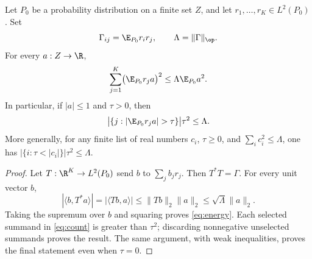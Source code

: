 \begin{lemma}\label{thm:energy}
Let $P_0$ be a probability distribution on a finite set $Z$, and let $r_1,\ldots,r_K\in L^2(P_0)$. Set
\[
 \Gamma_{ij}=\E_{P_0}r_i r_j,\qquad \Lambda=\|\Gamma\|_\op.
\]
For every $a:Z\to\R$,
\begin{equation}\label{eq:energy}
 \sum_{j=1}^K\bigl(\E_{P_0}r_j a\bigr)^2
 \leq\Lambda\E_{P_0}a^2.
\end{equation}
In particular, if $|a|\leq1$ and $\tau>0$, then
\begin{equation}\label{eq:count}
 \bigl|\{j:|\E_{P_0}r_j a|>\tau\}\bigr|\tau^2\leq\Lambda.
\end{equation}
More generally, for any finite list of real numbers $c_i$, $\tau\geq0$, and $\sum_i c_i^2\leq\Lambda$, one has $|\{i:\tau<|c_i|\}|\tau^2\leq\Lambda$.
\end{lemma}
\begin{proof}
Let $T:\R^K\to L^2(P_0)$ send $b$ to $\sum_jb_jr_j$. Then $T^*T=\Gamma$. For every unit vector $b$,
\[
 |\langle b,T^*a\rangle|=|\langle Tb,a\rangle|
 \leq\|Tb\|_2\|a\|_2\leq\sqrt\Lambda\|a\|_2.
\]
Taking the supremum over $b$ and squaring proves \eqref{eq:energy}. Each selected summand in \eqref{eq:count} is greater than $\tau^2$; discarding nonnegative unselected summands proves the result. The same argument, with weak inequalities, proves the final statement even when $\tau=0$.
\end{proof}

